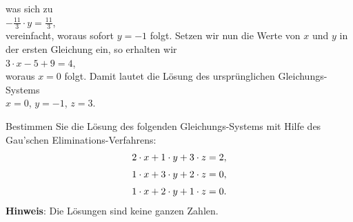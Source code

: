was sich zu
\\[0.2cm]
\hspace*{1.3cm} $-\frac{11}{3} \cdot y = \frac{11}{3}$,
\\[0.2cm]
vereinfacht, woraus sofort $y = -1$ folgt.  Setzen wir nun die Werte von $x$ und $y$ in der ersten
Gleichung ein, so erhalten wir
\\[0.2cm]
\hspace*{1.3cm} $3 \cdot x - 5 + 9 = 4$,
\\[0.2cm]
woraus $x = 0$ folgt. Damit lautet die L\"{o}sung des urspr\"{u}nglichen Gleichungs-Systems
\\[0.2cm]
\hspace*{1.3cm} 
$x = 0$, \quad $y = -1$, \quad $z = 3$.
\pagebreak

\exercise
Bestimmen  Sie die L\"{o}sung des folgenden Gleichungs-Systems mit Hilfe des Gau\3'schen
Eliminations-Verfahrens:
\begin{equation*}
\begin{array}[c]{l}
  2 \cdot x + 1 \cdot y + 3 \cdot z = 2, \\[0.2cm]
  1 \cdot x + 3 \cdot y + 2 \cdot z = 0, \\[0.2cm]
  1 \cdot x + 2 \cdot y + 1 \cdot z = 0.
\end{array}
\end{equation*}
\textbf{Hinweis}: Die L\"{o}sungen sind keine ganzen Zahlen.
\vspace*{0.3cm}

